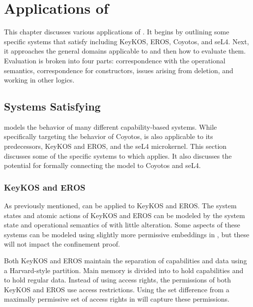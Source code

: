 \chapter{Applications of \TMmodelName{}}
\label{ch:corr}

This chapter discusses various applications of \TMmodelName{}.
It begins by outlining some specific systems that satisfy \TMmodelName{} including KeyKOS, EROS, Coyotos, and seL4.
Next, it approaches the general domains applicable to \TMmodelName{} and then how to evaluate them.
Evaluation is broken into four parts: correspondence with the operational semantics, correspondence for constructors, issues arising from deletion, and working in other logics. 

\section{Systems Satisfying \TMmodelName{}}

\TMmodelName{} models the behavior of many different capability-based systems.
While specifically targeting the behavior of Coyotos, \TMmodelName{} is also applicable to its predecessors, KeyKOS and EROS, and the seL4 microkernel.
This section discusses some of the specific systems to which \TMmodelName{} applies.
It also discusses the potential for formally connecting the model to Coyotos and seL4.

\subsection{KeyKOS and EROS}

As previously mentioned, \TMmodelName{} can be applied to KeyKOS and EROS.
The system states and atomic actions of KeyKOS and EROS can be modeled by the system state and operational semantics of \TMmodelName{} with little alteration.
Some aspects of these systems can be modeled using slightly more permissive embeddings in \TMmodelName{}, but these will not impact the confinement proof.

Both KeyKOS and EROS maintain the separation of capabilities and data using a Harvard-style partition.
Main memory is divided into  to hold capabilities and  to hold regular data.
Instead of using access rights, the permissions of both KeyKOS and EROS use access restrictions.
Using the set difference from a maximally permissive set of access rights in \TMmodelName{} will capture these permissions.

